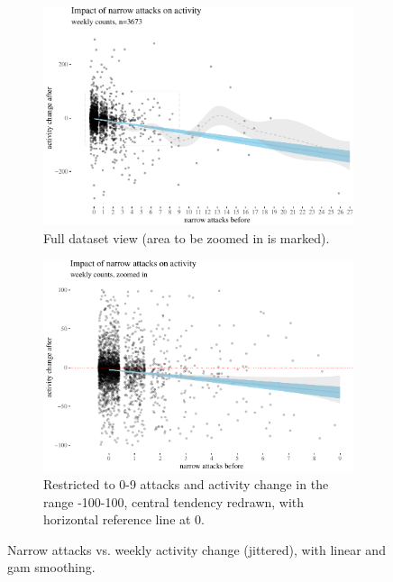 \documentclass[10pt,]{scrartcl}
\begin{document}
\begin{figure}
\begin{subfigure}[b]{0.95\textwidth}

\begin{center}\includegraphics[width=1\linewidth]{redditAnalysisWalkthrough_files/figure-latex/unnamed-chunk-8-1} \end{center}
\caption{Full dataset view (area to be zoomed in is marked).}
\end{subfigure}

\vspace{3mm}
 
\begin{subfigure}[b]{0.95\textwidth}

\begin{center}\includegraphics[width=1\linewidth]{redditAnalysisWalkthrough_files/figure-latex/unnamed-chunk-9-1} \end{center}
\caption{Restricted to 0-9 attacks and activity change in the range -100-100, central tendency redrawn, with horizontal reference line at 0.}
\end{subfigure}
\caption{Narrow attacks vs. weekly activity change (jittered), with  linear and gam smoothing.}
\label{fig:highPlots}
\end{figure}
\end{document}
